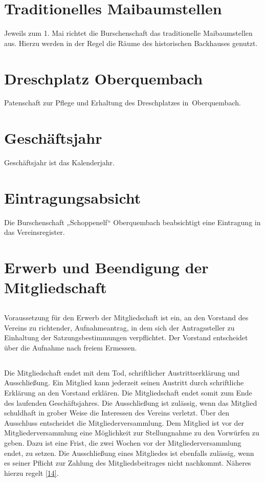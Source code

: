 \section{Traditionelles Maibaumstellen}
Jeweils zum 1. Mai richtet die Burschenschaft das traditionelle Maibaumstellen aus. Hierzu werden in der Regel die Räume des historischen Backhauses genutzt.

\section{Dreschplatz Oberquembach}
Patenschaft zur Pflege und Erhaltung des Dreschplatzes in Oberquembach.

\section{Geschäftsjahr}
Geschäftsjahr ist das Kalenderjahr.

\section{Eintragungsabsicht}
Die Burschenschaft „Schoppenelf“ Oberquembach beabsichtigt eine Eintragung in das Vereinsregister.

\section{Erwerb und Beendigung der Mitgliedschaft}
	\subsection{} Voraussetzung für den Erwerb der Mitgliedschaft ist ein, an den Vorstand des Vereins zu richtender, Aufnahmeantrag, in dem sich der Antragssteller zu Einhaltung der Satzungsbestimmungen verpflichtet. Der Vorstand entscheidet über die Aufnahme nach freiem Ermessen.
	
	\subsection{} Die Mitgliedschaft endet mit dem Tod, schriftlicher Austrittserklärung und Ausschließung. Ein Mitglied kann jederzeit seinen Austritt durch schriftliche Erklärung an den Vorstand erklären. Die Mitgliedschaft endet somit zum Ende des laufenden Geschäftsjahres. 
	Die Ausschließung ist zulässig, wenn das Mitglied schuldhaft in grober Weise die Interessen des Vereins verletzt. Über den Ausschluss entscheidet die Mitgliederversammlung. Dem Mitglied ist vor der Mitgliederversammlung eine Möglichkeit zur Stellungnahme zu den Vorwürfen zu geben. Dazu ist eine Frist, die zwei Wochen vor der Mitgliederversammlung endet, zu setzen. Die Ausschließung eines Mitgliedes ist ebenfalls zulässig, wenn es seiner Pflicht zur Zahlung des Mitgliedsbeitrages nicht nachkommt. Näheres hierzu regelt \ref{14}.
	
